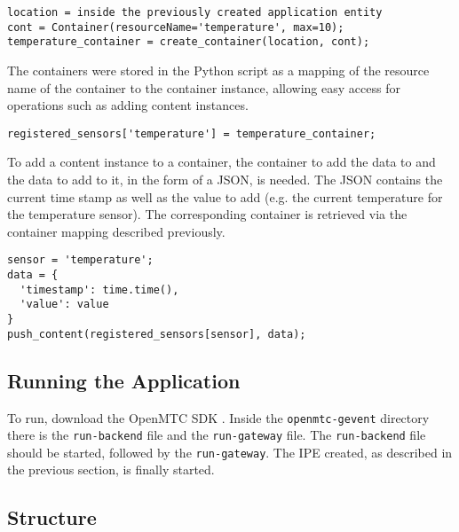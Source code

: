 \begin{lstlisting}[caption={Creating Containers}, label={lst:creating-containers}]
location = inside the previously created application entity
cont = Container(resourceName='temperature', max=10);
temperature_container = create_container(location, cont); 
\end{lstlisting}

The containers were stored in the Python script as a mapping of the resource name of the container to the container instance, allowing easy access for operations such as adding content instances.\\

\begin{lstlisting}[caption={Creating Content Instances}, label={lst:creating-content-instances}]
registered_sensors['temperature'] = temperature_container;
\end{lstlisting}

To add a content instance to a container, the container to add the data to and the data to add to it, in the form of a JSON, is needed. The JSON contains the current time stamp as well as the value to add (e.g. the current temperature for the temperature sensor). The corresponding container is retrieved via the container mapping described previously.\\

\begin{lstlisting}[caption={Creating Content}, label={lst:creating-content}]
sensor = 'temperature';
data = {
  'timestamp': time.time(),
  'value': value
}
push_content(registered_sensors[sensor], data);
\end{lstlisting}

\subsection{Running the Application}

To run, download the OpenMTC SDK \cite{OpenMTC2017OpenMTC}. Inside the \lstinline{openmtc-gevent} directory there is the \lstinline{run-backend} file and the \lstinline{run-gateway} file. The \lstinline{run-backend} file should be started, followed by the \lstinline{run-gateway}. The IPE created, as described in the previous section, is finally started.

\subsection{Structure}
\label{fig:Structure}

